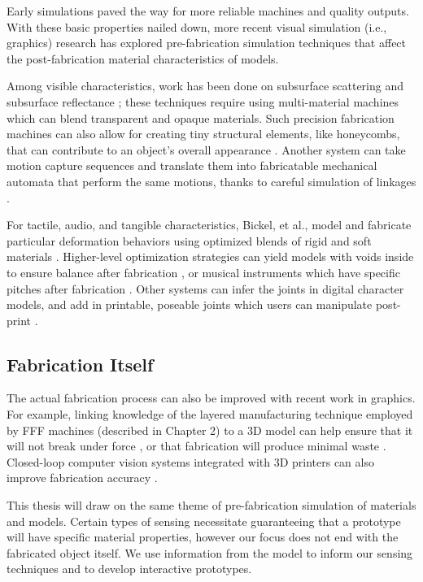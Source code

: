     Early simulations paved the way for more reliable machines and quality outputs. With these basic properties nailed down, more recent visual simulation (i.e., graphics) research has explored pre-fabrication simulation techniques that affect the post-fabrication material characteristics of models.

    Among visible characteristics, work has been done on subsurface scattering \cite{hasan-subsurface} and subsurface reflectance \cite{weyrich-reflectance}; these techniques require using multi-material machines which can blend transparent and opaque materials. Such precision fabrication machines can also allow for creating tiny structural elements, like honeycombs, that can contribute to an object's overall appearance \cite{lan-appearance}. Another system can take motion capture sequences and translate them into fabricatable mechanical automata that perform the same motions, thanks to careful simulation of linkages \cite{ceylan-automata}.

    For tactile, audio, and tangible characteristics, Bickel, et al., model and fabricate particular deformation behaviors using optimized blends of rigid and soft materials \cite{bickel-deformation}. Higher-level optimization strategies can yield models with voids inside to ensure balance after fabrication \cite{prevost-makeitstand}, or musical instruments which have specific pitches after fabrication \cite{umetani-metallophone}. Other systems can infer the joints in digital character models, and add in printable, poseable joints which users can manipulate post-print \cite{bacher-posable,cali-articulated}.

    \subsection{Fabrication Itself}

    The actual fabrication process can also be improved with recent work in graphics. For example, linking knowledge of the layered manufacturing technique employed by FFF machines (described in Chapter 2) to a 3D model can help ensure that it will not break under force \cite{umetani-strength}, or that fabrication will produce minimal waste \cite{schmidt-support}. Closed-loop computer vision systems integrated with 3D printers can also improve fabrication accuracy \cite{sitthi-multifab}.

    This thesis will draw on the same theme of pre-fabrication simulation of materials and models. Certain types of sensing necessitate guaranteeing that a prototype will have specific material properties, however our focus does not end with the fabricated object itself. We use information from the model to inform our sensing techniques and to develop interactive prototypes.

